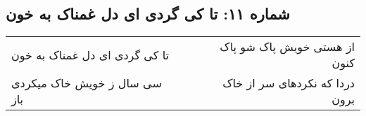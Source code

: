 \begin{center}
\section*{شماره ۱۱: تا کی گردی ای دل غمناک به خون}
\label{sec:011}
\begin{longtable}{l p{0.5cm} r}
تا کی گردی ای دل غمناک به خون
&&
از هستی خویش پاک شو پاک کنون
\\
سی سال ز خویش خاک میکردی باز
&&
دردا که نکردهای سر از خاک برون
\\
\end{longtable}
\end{center}
